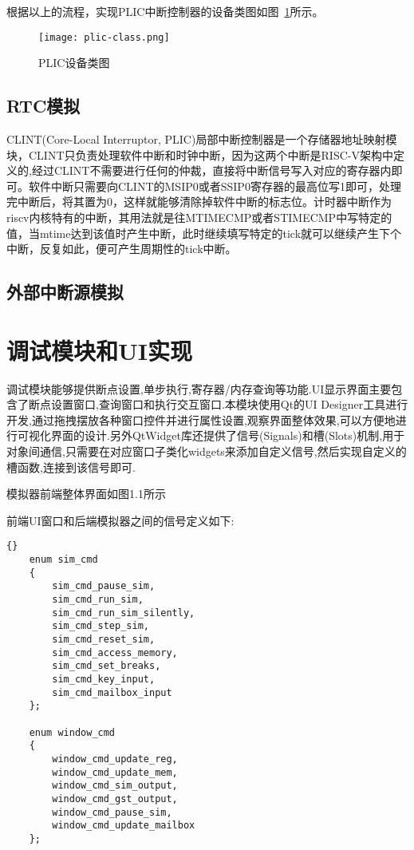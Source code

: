 根据以上的流程，实现PLIC中断控制器的设备类图如图~\ref{fig:plic-class}所示。
\begin{figure}[h]
    \centering
    \texttt{[image: plic-class.png]}
    \caption{PLIC设备类图}
    \label{fig:plic-class}
\end{figure}


\subsection{RTC模拟}

CLINT(Core-Local Interruptor, PLIC)局部中断控制器是一个存储器地址映射模块，CLINT只负责处理软件中断和时钟中断，因为这两个中断是RISC-V架构中定义的,经过CLINT不需要进行任何的仲裁，直接将中断信号写入对应的寄存器内即可。软件中断只需要向CLINT的MSIP0或者SSIP0寄存器的最高位写1即可，处理完中断后，将其置为0，这样就能够清除掉软件中断的标志位。计时器中断作为riscv内核特有的中断，其用法就是往MTIMECMP或者STIMECMP中写特定的值，当mtime达到该值时产生中断，此时继续填写特定的tick就可以继续产生下个中断，反复如此，便可产生周期性的tick中断。

\subsection{外部中断源模拟}


\section{调试模块和UI实现}
调试模块能够提供断点设置,单步执行,寄存器/内存查询等功能.UI显示界面主要包含了断点设置窗口,查询窗口和执行交互窗口.本模块使用Qt的UI Designer工具进行开发,通过拖拽摆放各种窗口控件并进行属性设置,观察界面整体效果,可以方便地进行可视化界面的设计.另外QtWidget库还提供了信号(Signals)和槽(Slots)机制,用于对象间通信,只需要在对应窗口子类化widgets来添加自定义信号,然后实现自定义的槽函数,连接到该信号即可.


模拟器前端整体界面如图1.1所示


前端UI窗口和后端模拟器之间的信号定义如下:
\begin{lstlisting}{}
    enum sim_cmd
    {
        sim_cmd_pause_sim,
        sim_cmd_run_sim,
        sim_cmd_run_sim_silently,
        sim_cmd_step_sim,
        sim_cmd_reset_sim,
        sim_cmd_access_memory,
        sim_cmd_set_breaks,
        sim_cmd_key_input,
        sim_cmd_mailbox_input
    };
    
    enum window_cmd
    {
        window_cmd_update_reg,
        window_cmd_update_mem,
        window_cmd_sim_output,
        window_cmd_gst_output,
        window_cmd_pause_sim,
        window_cmd_update_mailbox
    };          
\end{lstlisting}


